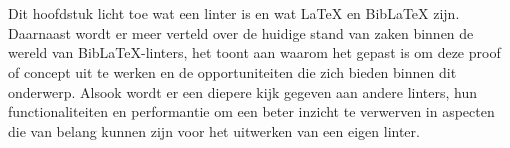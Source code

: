 \chapter{}%
\label{ch:stand-van-zaken}






Dit hoofdstuk licht toe wat een linter is en wat \LaTeX{} en BibLaTeX zijn. Daarnaast wordt er meer verteld over de huidige stand van zaken binnen de wereld van BibLaTeX-linters, het toont aan waarom het gepast is om deze proof of concept uit te werken en de opportuniteiten die zich bieden binnen dit onderwerp. Alsook wordt er een diepere kijk gegeven aan andere linters, hun functionaliteiten en performantie om een beter inzicht te verwerven in aspecten die van belang kunnen zijn voor het uitwerken van een eigen linter.

